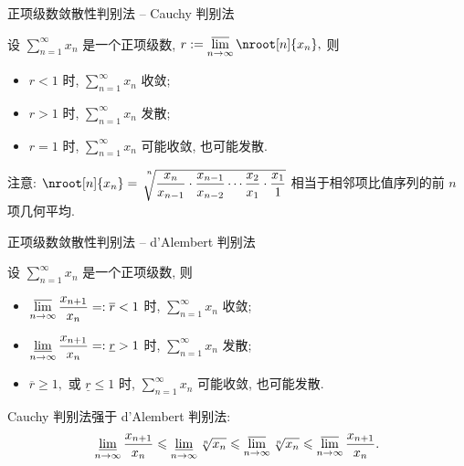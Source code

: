 \begin{frame}{正项级数敛散性判别法 -- Cauchy 判别法}

\begin{thm}
设 $\sum\limits_{n=1}^{\infty} x_n$ 是一个正项级数, $r := \varlimsup\limits_{n\to\infty} \nroot[n]{x_n},$ 则
\begin{itemize}
\item $r < 1$ 时, $\sum\limits_{n=1}^{\infty} x_n$ 收敛;
\item $r > 1$ 时, $\sum\limits_{n=1}^{\infty} x_n$ 发散;
\item $r = 1$ 时, $\sum\limits_{n=1}^{\infty} x_n$ 可能收敛, 也可能发散.
\end{itemize}
\end{thm}

注意: $\nroot[n]{x_n} = \sqrt[\leftroot{-3}\uproot{15}n]{\dfrac{x_n}{x_{n-1}} \cdot \dfrac{x_{n-1}}{x_{n-2}} \cdots \dfrac{x_2}{x_1} \cdot \dfrac{x_1}{1}}$ 相当于相邻项比值序列的前 $n$ 项几何平均.

\end{frame}


\begin{frame}{正项级数敛散性判别法 -- d'Alembert 判别法}

\begin{thm}
设 $\sum\limits_{n=1}^{\infty} x_n$ 是一个正项级数, 则
\begin{itemize}
\item $\varlimsup\limits_{n\to\infty} \dfrac{x_{n+1}}{x_n} =: \overline{r} < 1$ 时, $\sum\limits_{n=1}^{\infty} x_n$ 收敛;
\item $\varliminf\limits_{n\to\infty} \dfrac{x_{n+1}}{x_n} =: \underline{r} > 1$ 时, $\sum\limits_{n=1}^{\infty} x_n$ 发散;
\item $\overline{r} \geqslant 1,$ 或 $\underline{r} \leqslant 1$ 时, $\sum\limits_{n=1}^{\infty} x_n$ 可能收敛, 也可能发散.
\end{itemize}
\end{thm}

\pause

\begin{attnblock}
Cauchy 判别法强于 d'Alembert 判别法:
\vspace{-0.6em}
\[\varliminf\limits_{n\to\infty} \dfrac{x_{n+1}}{x_n} \leqslant \varliminf\limits_{n\to\infty} \sqrt[n]{x_n} \leqslant \varlimsup\limits_{n\to\infty} \sqrt[n]{x_n} \leqslant \varlimsup\limits_{n\to\infty} \dfrac{x_{n+1}}{x_n}.\]
\end{attnblock}

\end{frame}

